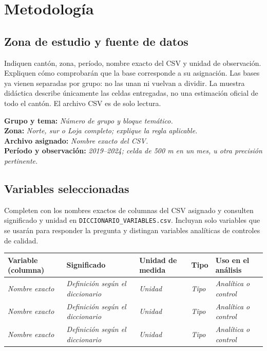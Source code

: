 \documentclass[11pt,a4paper]{article}
\newcommand{\completar}[1]{\textit{\textcolor{gris}{#1}}}
\begin{document}
\section{Metodología}
\subsection{Zona de estudio y fuente de datos}
Indiquen cantón, zona, período, nombre exacto del CSV y unidad de observación. Expliquen cómo comprobarán que la base corresponde a su asignación. Las bases ya vienen separadas por grupo: no las unan ni vuelvan a dividir. La muestra didáctica describe únicamente las celdas entregadas, no una estimación oficial de todo el cantón. El archivo CSV es de solo lectura.

\textbf{Grupo y tema:} \completar{Número de grupo y bloque temático.}\\
\textbf{Zona:} \completar{Norte, sur o Loja completo; explique la regla aplicable.}\\
\textbf{Archivo asignado:} \completar{Nombre exacto del CSV.}\\
\textbf{Período y observación:} \completar{2019--2024; celda de 500 m en un mes, u otra precisión pertinente.}

\subsection{Variables seleccionadas}
Completen con los nombres exactos de columnas del CSV asignado y consulten significado y unidad en \texttt{DICCIONARIO\_VARIABLES.csv}. Incluyan solo variables que se usarán para responder la pregunta y distingan variables analíticas de controles de calidad.

\small
\begin{tabularx}{\linewidth}{>{\raggedright\arraybackslash}p{4.0cm} X >{\raggedright\arraybackslash}p{2.1cm} >{\raggedright\arraybackslash}p{1.7cm} >{\raggedright\arraybackslash}p{2.2cm}}
\toprule
\textbf{Variable (columna)} & \textbf{Significado} & \textbf{Unidad de medida} & \textbf{Tipo} & \textbf{Uso en el análisis}\\
\midrule
\completar{Nombre exacto} & \completar{Definición según el diccionario} & \completar{Unidad} & \completar{Tipo} & \completar{Analítica o control}\\
\completar{Nombre exacto} & \completar{Definición según el diccionario} & \completar{Unidad} & \completar{Tipo} & \completar{Analítica o control}\\
\completar{Nombre exacto} & \completar{Definición según el diccionario} & \completar{Unidad} & \completar{Tipo} & \completar{Analítica o control}\\
\bottomrule
\end{tabularx}
\normalsize
\end{document}
